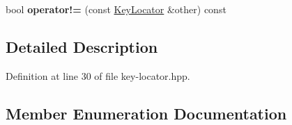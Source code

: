 \begin{DoxyCompactItemize}
\item 
bool {\bfseries operator!=} (const \hyperlink{classndn_1_1KeyLocator}{Key\+Locator} \&other) const\hypertarget{classndn_1_1KeyLocator_a638b9c7a49033160c4da1604763fb326}{}\label{classndn_1_1KeyLocator_a638b9c7a49033160c4da1604763fb326}

\end{DoxyCompactItemize}


\subsection{Detailed Description}


Definition at line 30 of file key-\/locator.\+hpp.



\subsection{Member Enumeration Documentation}
